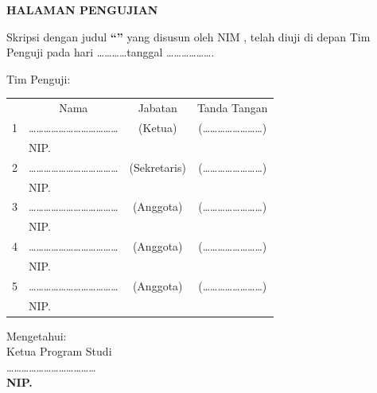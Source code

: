 \thispagestyle{frontmatter}
\begin{center}
    {\large\bfseries HALAMAN PENGUJIAN}\\[1cm]
\end{center}

\noindent Skripsi dengan judul \textbf{``\mhsjudul''} yang disusun oleh \textbf{\mhsname} NIM \textbf{\mhsnim}, telah diuji di depan Tim Penguji pada hari \dots\dots\dots\dots tanggal \dots\dots\dots\dots\dots\dots \mhstahun.

\vspace{1cm}

\noindent Tim Penguji:

\vspace{0.5cm}

\begin{table}[h]
    \centering
    \begin{tabular}{c l c c}
        & \multicolumn{1}{c}{Nama} & Jabatan & Tanda Tangan \\ [0.5cm]
        1 & \dots\dots\dots\dots\dots\dots\dots\dots\dots\dots\dots\dots & (Ketua) & (\dots\dots\dots\dots\dots\dots\dots\dots) \\
          & NIP. & & \\ [0.4cm]
        2 & \dots\dots\dots\dots\dots\dots\dots\dots\dots\dots\dots\dots & (Sekretaris) & (\dots\dots\dots\dots\dots\dots\dots\dots) \\
          & NIP. & & \\ [0.4cm]
        3 & \dots\dots\dots\dots\dots\dots\dots\dots\dots\dots\dots\dots & (Anggota) & (\dots\dots\dots\dots\dots\dots\dots\dots) \\
          & NIP. & & \\ [0.4cm]
        4 & \dots\dots\dots\dots\dots\dots\dots\dots\dots\dots\dots\dots & (Anggota) & (\dots\dots\dots\dots\dots\dots\dots\dots) \\
          & NIP. & & \\ [0.4cm]
        5 & \dots\dots\dots\dots\dots\dots\dots\dots\dots\dots\dots\dots & (Anggota) & (\dots\dots\dots\dots\dots\dots\dots\dots) \\
          & NIP. & & \\
    \end{tabular}
\end{table}

\vspace{1cm}

\begin{center}
    Mengetahui:\\[0.2cm]
    Ketua Program Studi \\[1.5cm]
    
    \dots\dots\dots\dots\dots\dots\dots\dots\dots\dots\dots\dots \\
    \textbf{NIP. \nipKaprodi}
\end{center}
\newpage

